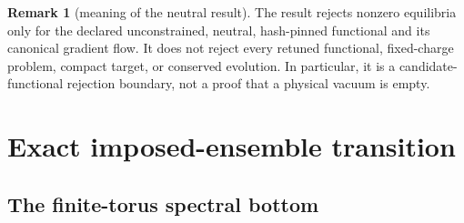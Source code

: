 \documentclass[11pt]{article}
\numberwithin{equation}{section}
\theoremstyle{definition}
\newtheorem{remark}[theorem]{Remark}
\begin{document}
\begin{remark}[meaning of the neutral result]
The result rejects nonzero equilibria only for the declared unconstrained,
neutral, hash-pinned functional and its canonical gradient flow.  It does not
reject every retuned functional, fixed-charge problem, compact target, or
conserved evolution.  In particular, it is a candidate-functional rejection
boundary, not a proof that a physical vacuum is empty.
\end{remark}

\section{Exact imposed-ensemble transition}
\label{sec:ensemble-proof}

\subsection{The finite-torus spectral bottom}
\end{document}

